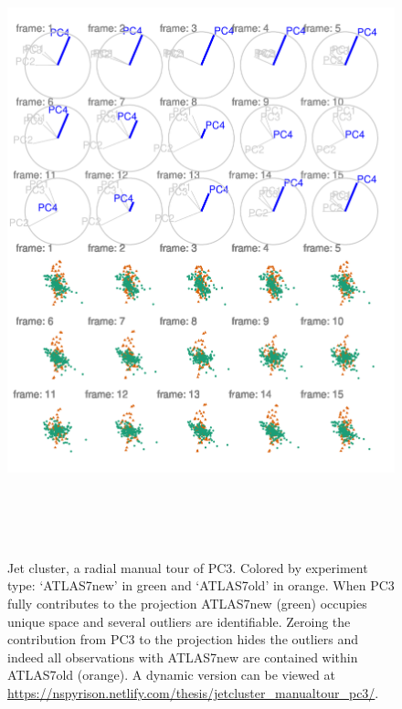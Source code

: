 \documentclass{monashthesis}
\theoremstyle{definition}
\theoremstyle{definition}
\theoremstyle{definition}
\theoremstyle{remark}
\begin{document}
\begin{figure}

{\centering \includegraphics[width=6in,height=7.2in]{./figures/JetClusterGood} 

}

\caption{Jet cluster, a radial manual tour of PC3.
Colored by experiment type: `ATLAS7new' in green and `ATLAS7old' in
orange. When PC3 fully contributes to the projection ATLAS7new (green)
occupies unique space and several outliers are identifiable. Zeroing the
contribution from PC3 to the projection hides the outliers and indeed
all observations with ATLAS7new are contained within ATLAS7old (orange).
A dynamic version can be viewed at
\url{https://nspyrison.netlify.com/thesis/jetcluster_manualtour_pc3/}.}\label{fig:JetClusterGood}
\end{figure}
\end{document}
